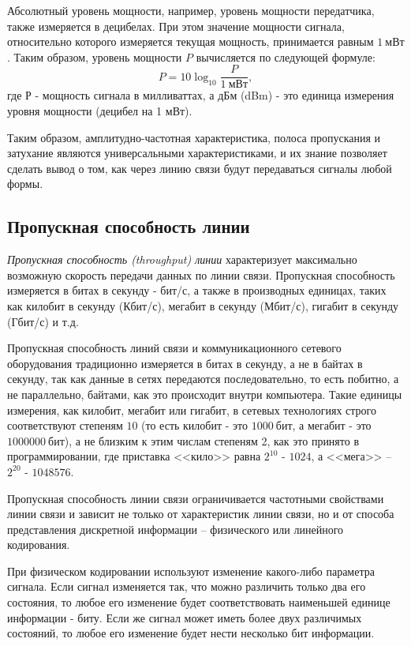 Абсолютный уровень мощности, например, уровень мощности передатчика, также измеряется в децибелах.
При этом значение мощности сигнала, относительно которого измеряется текущая мощность, принимается равным $1~мВт$.
Таким образом, уровень мощности $P$ вычисляется по следующей формуле:
\[
    P = 10 \log_{10} \frac{P}{1~\text{мВт}},
\]
где $Р$ - мощность сигнала в милливаттах, а дБм (dBm) - это единица измерения уровня мощности (децибел на 1 мВт).

Таким образом, амплитудно-частотная характеристика, полоса пропускания и затухание являются универсальными характеристиками, и их знание позволяет сделать вывод о том, как через линию связи будут передаваться сигналы любой формы.

\subsection{Пропускная способность линии}

\emph{Пропускная способность (throughput) линии} характеризует максимально возможную скорость передачи данных по линии связи.
Пропускная способность измеряется в битах в секунду - бит/с, а также в производных единицах, таких как килобит в секунду (Кбит/с), мегабит в секунду (Мбит/с), гигабит в секунду (Гбит/с) и т.д.

Пропускная способность линий связи и коммуникационного сетевого оборудования традиционно измеряется в битах в секунду, а не в байтах в секунду, так как данные в сетях передаются последовательно, то есть побитно, а не параллельно, байтами, как это происходит внутри компьютера.
Такие единицы измерения, как килобит, мегабит или гигабит, в сетевых технологиях строго соответствуют степеням $10$ (то есть килобит - это $1000~бит$, а мегабит - это $1 000 000~бит$), а не близким к этим числам степеням 2, как это принято в программировании, где приставка <<кило>> равна $2^{10}$ - $1024$, а <<мега>> – $2^{20}$ - $1 048 576$.

Пропускная способность линии связи ограничивается частотными свойствами линии связи и зависит не только от характеристик линии связи, но и от способа представления дискретной информации – физического или линейного кодирования.

При физическом кодировании используют изменение какого-либо параметра сигнала.
Если сигнал изменяется так, что можно различить только два его состояния, то любое его изменение будет соответствовать наименьшей единице информации - биту.
Если же сигнал может иметь более двух различимых состояний, то любое его изменение будет нести несколько бит информации.

